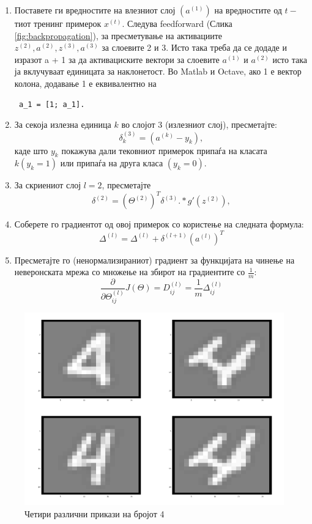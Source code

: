\begin{enumerate}
  \item Поставете ги вредностите на влезниот слој $(a^{(1)})$ на вредностите од
  $t-$тиот тренинг примерок $x^{(t)}$. Следува feedforward (Слика
  \ref{fig:backpropagation}), за пресметување на активациите $z^{(2)}, a^{(2)},
  z^{(3)}, a^{(3)}$ за слоевите 2 и 3. Исто така треба да се додаде и изразот a + 1 за да активациските
  вектори за слоевите $a^{(1)}$ и $a^{(2)}$ исто така ја вклучуваат единицата
  за наклонетост. Во Matlab и Octave, ако 1 е вектор колона, додавање 1 е
  еквивалентно на \begin{verbatim} a_1 = [1; a_1]. \end{verbatim}
  \item За секоја излезна единица $k$ во слојот 3 (излезниот слој), пресметајте:
  \[
  	\delta_k^{(3)} = (a^{(k)} - y_k),
	\]
	каде што $y_k $ покажува дали тековниот примерок припаѓа на класата $k (y_k =
	1)$ или припаѓа на друга класа $(y_k = 0)$.
  \item За скриениот слој $l = 2$, пресметајте
   	\[
  	\delta^{(2)} = (\Theta^{(2)})^T \delta^{(3)} .* g'(z^{(2)}),
	\]
	\item Соберете го градиентот од овој примерок со користење на следната формула:
	\[
  	\Delta^{(l)} = \Delta^{(l)} + \delta^{(l + 1)}(a^{(l)})^T
	\]
	\item Пресметајте го (ненормализираниот) градиент за функцијата на чинење на
	неверонската мрежа со множење на збирот на градиентите со $\frac{1}{m}$:
	 \[
  	\frac{\partial}{\partial\Theta_{ij}^{(l)}} J(\Theta) = D_{ij}^{(l)} =
  	\frac{1}{m}\Delta_{ij}^{(l)}
	\]
	
\end{enumerate} 


\begin{figure}[htb]
\centering
\includegraphics[width=.6\textwidth]{src/neuralNetwork1/num_4}
\caption{Четири различни прикази на бројот 4}
\label{fig:num4}
\end{figure}

